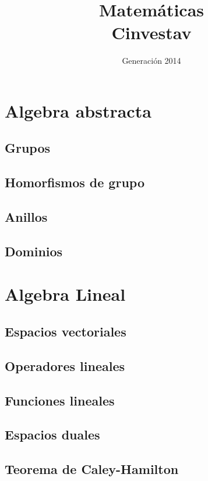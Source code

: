 \documentclass{tufte-book}
\title{Matemáticas \\ Cinvestav}
\author{Generación 2014}
\numberwithin{equation}{chapter}
\begin{document}
  \maketitle
  \tableofcontents
  \part{Algebra abstracta}
    \chapter{Grupos}
      
      
      
      
    \chapter{Homorfismos de grupo}
      
    \chapter{Anillos}
      
    \chapter{Dominios}
  \part{Algebra Lineal}
    \chapter{Espacios vectoriales}
    
    
    
    
    \chapter{Operadores lineales}
    \chapter{Funciones lineales}
    \chapter{Espacios duales}
    \chapter{Teorema de Caley-Hamilton}
\end{document}
